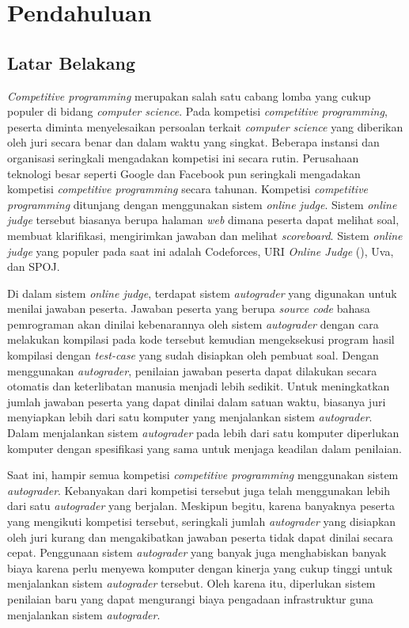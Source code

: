 \chapter{Pendahuluan}

\section{Latar Belakang}

\par \textit{Competitive programming} merupakan salah satu cabang lomba yang cukup populer di bidang \textit{computer science}. Pada kompetisi \textit{competitive programming}, peserta diminta menyelesaikan persoalan terkait \textit{computer science} yang diberikan oleh juri secara benar dan dalam waktu yang singkat. Beberapa instansi dan organisasi seringkali mengadakan kompetisi ini secara rutin. Perusahaan teknologi besar seperti Google dan Facebook pun seringkali mengadakan kompetisi \textit{competitive programming} secara tahunan. Kompetisi \textit{competitive programming} ditunjang dengan menggunakan sistem \textit{online judge}. Sistem \textit{online judge} tersebut biasanya berupa halaman \textit{web} dimana peserta dapat melihat soal, membuat klarifikasi, mengirimkan jawaban dan melihat \textit{scoreboard}. Sistem \textit{online judge} yang populer pada saat ini adalah Codeforces, URI \textit{Online Judge} (\cite{uriojpaper}), Uva, dan SPOJ.

\par Di dalam sistem \textit{online judge}, terdapat sistem \textit{autograder} yang digunakan untuk menilai jawaban peserta. Jawaban peserta yang berupa \textit{source code} bahasa pemrograman akan dinilai kebenarannya oleh sistem \textit{autograder} dengan cara melakukan kompilasi pada kode tersebut kemudian mengeksekusi program hasil kompilasi dengan \textit{test-case} yang sudah disiapkan oleh pembuat soal. Dengan menggunakan \textit{autograder}, penilaian jawaban peserta dapat dilakukan secara otomatis dan keterlibatan manusia menjadi lebih sedikit. Untuk meningkatkan jumlah jawaban peserta yang dapat dinilai dalam satuan waktu, biasanya juri menyiapkan lebih dari satu komputer yang menjalankan sistem \textit{autograder}. Dalam menjalankan sistem \textit{autograder} pada lebih dari satu komputer diperlukan komputer dengan spesifikasi yang sama untuk menjaga keadilan dalam penilaian.

\par Saat ini, hampir semua kompetisi \textit{competitive programming} menggunakan sistem \textit{autograder}. Kebanyakan dari kompetisi tersebut juga telah menggunakan lebih dari satu \textit{autograder} yang berjalan. Meskipun begitu, karena banyaknya peserta yang mengikuti kompetisi tersebut, seringkali jumlah \textit{autograder} yang disiapkan oleh juri kurang dan mengakibatkan jawaban peserta tidak dapat dinilai secara cepat. Penggunaan sistem \textit{autograder} yang banyak juga menghabiskan banyak biaya karena perlu menyewa komputer dengan kinerja yang cukup tinggi untuk menjalankan sistem \textit{autograder} tersebut. Oleh karena itu, diperlukan sistem penilaian baru yang dapat mengurangi biaya pengadaan infrastruktur guna menjalankan sistem \textit{autograder}.

